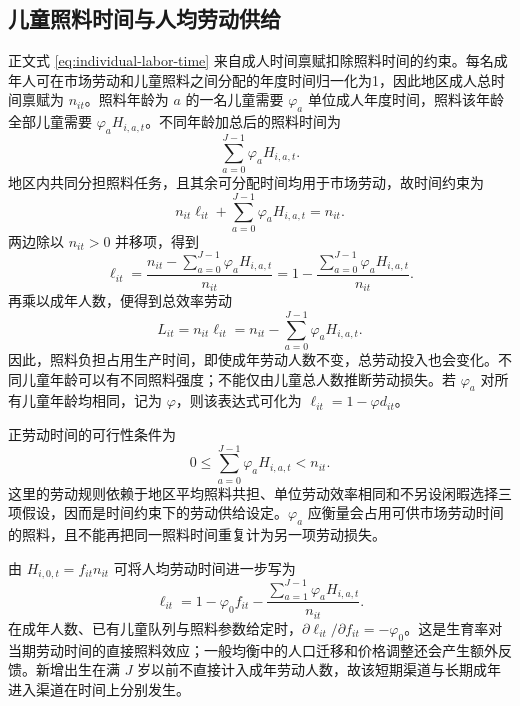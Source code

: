 \documentclass[UTF8,a4paper,zihao=-4,fontset=windows]{ctexart}
\numberwithin{equation}{section}
\begin{document}
\subsection{儿童照料时间与人均劳动供给}
\label{app:labor-time}

正文式 \eqref{eq:individual-labor-time} 来自成人时间禀赋扣除照料时间的约束。每名成年人可在市场劳动和儿童照料之间分配的年度时间归一化为1，因此地区成人总时间禀赋为 $n_{it}$。照料年龄为 $a$ 的一名儿童需要 $\varphi_a$ 单位成人年度时间，照料该年龄全部儿童需要 $\varphi_aH_{i,a,t}$。不同年龄加总后的照料时间为
\begin{equation}
  \sum_{a=0}^{J-1}\varphi_aH_{i,a,t}.
  \label{eq:app-care-time}
\end{equation}
地区内共同分担照料任务，且其余可分配时间均用于市场劳动，故时间约束为
\begin{equation}
  n_{it}\ell_{it}+\sum_{a=0}^{J-1}\varphi_aH_{i,a,t}=n_{it}.
  \label{eq:app-time-constraint}
\end{equation}
两边除以 $n_{it}>0$ 并移项，得到
\begin{equation}
  \ell_{it}
  =\frac{n_{it}-\sum_{a=0}^{J-1}\varphi_aH_{i,a,t}}{n_{it}}
  =1-\frac{\sum_{a=0}^{J-1}\varphi_aH_{i,a,t}}{n_{it}}.
  \label{eq:app-labor-time}
\end{equation}
再乘以成年人数，便得到总效率劳动
\begin{equation}
  L_{it}=n_{it}\ell_{it}
        =n_{it}-\sum_{a=0}^{J-1}\varphi_aH_{i,a,t}.
  \label{eq:app-effective-labor}
\end{equation}
因此，照料负担占用生产时间，即使成年劳动人数不变，总劳动投入也会变化。不同儿童年龄可以有不同照料强度；不能仅由儿童总人数推断劳动损失。若 $\varphi_a$ 对所有儿童年龄均相同，记为 $\varphi$，则该表达式可化为 $\ell_{it}=1-\varphi d_{it}$。

正劳动时间的可行性条件为
\begin{equation}
  0\leq\sum_{a=0}^{J-1}\varphi_aH_{i,a,t}<n_{it}.
  \label{eq:app-time-feasibility}
\end{equation}
这里的劳动规则依赖于地区平均照料共担、单位劳动效率相同和不另设闲暇选择三项假设，因而是时间约束下的劳动供给设定。$\varphi_a$ 应衡量会占用可供市场劳动时间的照料，且不能再把同一照料时间重复计为另一项劳动损失。

由 $H_{i,0,t}=f_{it}n_{it}$ 可将人均劳动时间进一步写为
\begin{equation}
  \ell_{it}=1-\varphi_0f_{it}
      -\frac{\sum_{a=1}^{J-1}\varphi_aH_{i,a,t}}{n_{it}}.
  \label{eq:app-fertility-care-channel}
\end{equation}
在成年人数、已有儿童队列与照料参数给定时，$\partial\ell_{it}/\partial f_{it}=-\varphi_0$。这是生育率对当期劳动时间的直接照料效应；一般均衡中的人口迁移和价格调整还会产生额外反馈。新增出生在满 $J$ 岁以前不直接计入成年劳动人数，故该短期渠道与长期成年进入渠道在时间上分别发生。
\end{document}
